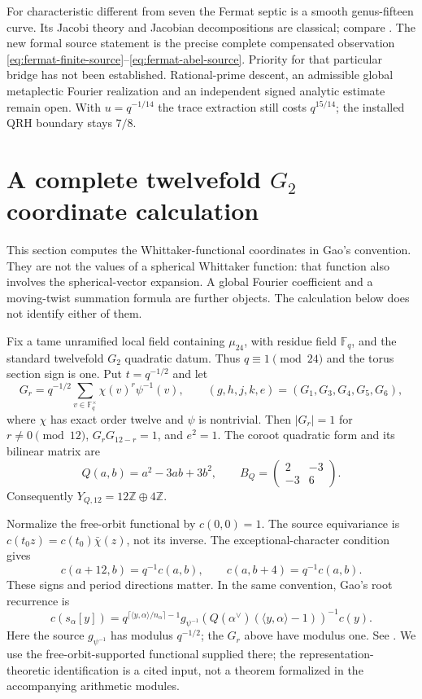 \documentclass[11pt]{article}
\newcommand{\ZZ}{\mathbb Z}
\begin{document}
For characteristic different from seven the Fermat septic is a
smooth genus-fifteen curve. Its Jacobi theory and Jacobian
decompositions are classical; compare
\cite[Theorems 6--7]{HidalgoRodriguez}. The new formal source
statement is the precise complete compensated observation
\eqref{eq:fermat-finite-source}--\eqref{eq:fermat-abel-source}.
Priority for that particular bridge has not been established.
Rational-prime descent, an admissible global metaplectic Fourier
realization and an independent signed analytic estimate remain
open. With $u=q^{-1/14}$ the trace extraction still costs
$q^{15/14}$; the installed QRH boundary stays $7/8$.


\section{A complete twelvefold $G_2$ coordinate calculation}
\label{sec:G2-coordinates}

This section computes the Whittaker-functional coordinates in Gao's
convention. They are not the values of a spherical Whittaker function:
that function also involves the spherical-vector expansion. A global
Fourier coefficient and a moving-twist summation formula are further
objects. The calculation below does not identify either of them.

Fix a tame unramified local field containing $\mu_{24}$, with residue
field $\mathbb F_q$, and the standard twelvefold $G_2$ quadratic datum.
Thus $q\equiv1\pmod{24}$ and the torus section sign is one. Put
$t=q^{-1/2}$ and let
\[
 G_r=q^{-1/2}\sum_{v\in\mathbb F_q^\times}\chi(v)^r\psi^{-1}(v),
 \qquad
 (g,h,j,k,e)=(G_1,G_3,G_4,G_5,G_6),
\]
where $\chi$ has exact order twelve and $\psi$ is nontrivial.
Then $|G_r|=1$ for $r\ne0\pmod{12}$,
$G_rG_{12-r}=1$, and $e^2=1$.
The coroot quadratic form and its bilinear matrix are
\[
 Q(a,b)=a^2-3ab+3b^2,\qquad
 B_Q=\begin{pmatrix}2&-3\\-3&6\end{pmatrix}.
\]
Consequently $Y_{Q,12}=12\ZZ\oplus4\ZZ$.

Normalize the free-orbit functional by $c(0,0)=1$. The source
equivariance is $c(t_0z)=c(t_0)\bar\chi(z)$, not its inverse.
The exceptional-character condition gives
\[
 c(a+12,b)=q^{-1}c(a,b),\qquad
 c(a,b+4)=q^{-1}c(a,b).
 \tag{G2.1}
\]
These signs and period directions matter. In the same convention,
Gao's root recurrence is
\[
 c(s_\alpha[y])=
 q^{\lceil\langle y,\alpha\rangle/n_\alpha\rceil-1}
 g_{\psi^{-1}}\!\left(Q(\alpha^\vee)
       (\langle y,\alpha\rangle-1)\right)^{-1}c(y).
 \tag{G2.2}
\]
Here the source $g_{\psi^{-1}}$ has modulus $q^{-1/2}$; the $G_r$
above have modulus one. See \cite[Section 3.1, Corollary 3.7,
Theorem 7.1]{Gao}. We use the free-orbit-supported functional supplied
there; the representation-theoretic identification is a cited input,
not a theorem formalized in the accompanying arithmetic modules.
\end{document}
